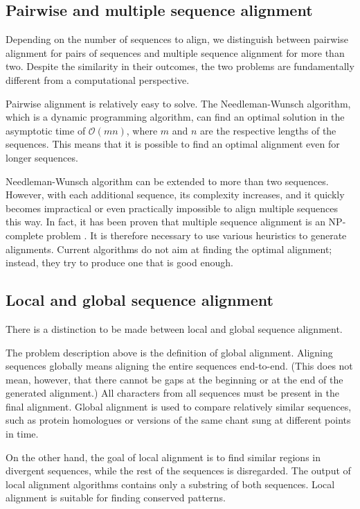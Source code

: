 \subsection{Pairwise and multiple sequence alignment}

Depending on the number of sequences to align, we distinguish between pairwise alignment for pairs of sequences and multiple sequence alignment
for more than two. Despite the similarity in their outcomes, the two problems are fundamentally different from a computational perspective.

Pairwise alignment is relatively easy to solve. The Needleman-Wunsch algorithm, which is a dynamic programming algorithm, can find an optimal
solution in the asymptotic time of $\mathcal{O}(mn)$, where $m$ and $n$ are the respective lengths of the sequences. This means that it is
possible to find an optimal alignment even for longer sequences.

Needleman-Wunsch algorithm can be extended to more than two sequences. However, with each additional sequence, its complexity increases,
and it quickly becomes impractical or even practically impossible to align multiple sequences this way. In fact, it has been proven that multiple sequence
alignment is an NP-complete problem \citep{msa_complexity}. It is therefore necessary to use various heuristics to generate alignments. Current
algorithms do not aim at finding the optimal alignment; instead, they try to produce one that is good enough.

\subsection{Local and global sequence alignment}

There is a distinction to be made between local and global sequence alignment.

The problem description above is the definition of global alignment. Aligning sequences globally means aligning the entire sequences end-to-end.
(This does not mean, however, that there cannot be gaps at the beginning or at the end of the generated alignment.)
All characters from all sequences must be present in the final alignment. Global alignment is used to compare relatively similar
sequences, such as protein homologues or versions of the same chant sung at different points in time.

On the other hand, the goal of local alignment is to find similar regions in divergent sequences, while the rest of the sequences is disregarded.
The output of local alignment algorithms contains only a substring of both sequences. Local alignment is suitable for finding conserved patterns.


